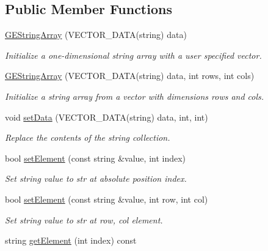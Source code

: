 \subsection*{Public Member Functions}
\begin{DoxyCompactItemize}
\item 
\hyperlink{class_g_e_string_array_a1ef29169e2bfc2fcd89619f127ef969f}{G\+E\+String\+Array} (V\+E\+C\+T\+O\+R\+\_\+\+D\+A\+TA(string) data)
\begin{DoxyCompactList}\small\item\em Initialize a one-\/dimensional string array with a user specified vector. \end{DoxyCompactList}\item 
\hyperlink{class_g_e_string_array_aa662f3f9a8cc261544e8a38c1e4955b5}{G\+E\+String\+Array} (V\+E\+C\+T\+O\+R\+\_\+\+D\+A\+TA(string) data, int rows, int cols)
\begin{DoxyCompactList}\small\item\em Initialize a string array from a vector with dimensions {\itshape rows} and {\itshape cols}. \end{DoxyCompactList}\item 
void \hyperlink{class_g_e_string_array_aea264a7ca7c1e81b4e2aaa8a45dd99d7}{set\+Data} (V\+E\+C\+T\+O\+R\+\_\+\+D\+A\+TA(string) data, int, int)
\begin{DoxyCompactList}\small\item\em Replace the contents of the string collection. \end{DoxyCompactList}\item 
bool \hyperlink{class_g_e_string_array_ac8731099a1d1a09a6a3fce0bc9495dfb}{set\+Element} (const string \&value, int index)
\begin{DoxyCompactList}\small\item\em Set string value to {\itshape str} at absolute position {\itshape index}. \end{DoxyCompactList}\item 
bool \hyperlink{class_g_e_string_array_ad546d10de2a18ecb393abe6e4e0ff3ec}{set\+Element} (const string \&value, int row, int col)
\begin{DoxyCompactList}\small\item\em Set string value to {\itshape str} at {\itshape row}, {\itshape col} element. \end{DoxyCompactList}\item 
string \hyperlink{class_g_e_string_array_a75a89c0b9e5bc4a677d1032516f72fce}{get\+Element} (int index) const

\end{DoxyCompactItemize}
